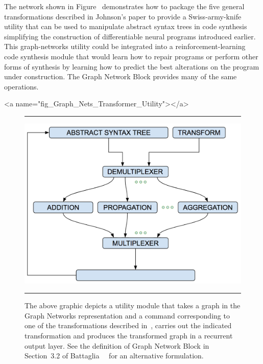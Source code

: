 The network shown in Figure~{} demonstrates how to package the five general transformations described in Johnson’s paper to provide a Swiss-army-knife utility that can be used to manipulate abstract syntax trees in code synthesis simplifying the construction of differentiable neural programs introduced earlier. This graph-networks utility could be integrated into a reinforcement-learning code synthesis module that would learn how to repair programs or perform other forms of synthesis by learning how to predict the best alterations on the program under construction. The Graph Network Block provides many of the same operations.


\setcounter{figure}{60}


\rawhtml
<a name="fig_Graph_Nets_Transformer_Utility"></a>
\endrawhtml
\begin{figure}
%
  \hrule{}
%
  \begin{center} 
    \includegraphics[width=375pt]{./figures/Graph_Nets_Transformer_Utility.png} %
  \end{center}
%
  \caption{The above graphic depicts a utility module that takes a graph in the Graph Networks representation and a command corresponding to one of the transformations described in~\cite{JohnsonICLR-17}, carries out the indicated transformation and produces the transformed graph in a recurrent output layer. See the definition of Graph Network Block in Section~3.2 of Battaglia~\etal{}~\cite{BattagliaetalCoRR-18} for an alternative formulation.}
%
  \hrule{}
%
\end{figure}

